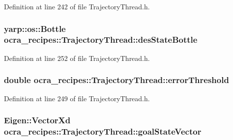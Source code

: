 Definition at line 242 of file Trajectory\+Thread.\+h.

\subsubsection[{\texorpdfstring{des\+State\+Bottle}{desStateBottle}}]{\setlength{\rightskip}{0pt plus 5cm}yarp\+::os\+::\+Bottle ocra\+\_\+recipes\+::\+Trajectory\+Thread\+::des\+State\+Bottle\hspace{0.3cm}{\ttfamily [protected]}}\hypertarget{classocra__recipes_1_1TrajectoryThread_aae66d09e0f64c124428cebcdb53bdf33}{}\label{classocra__recipes_1_1TrajectoryThread_aae66d09e0f64c124428cebcdb53bdf33}


Definition at line 252 of file Trajectory\+Thread.\+h.

\subsubsection[{\texorpdfstring{error\+Threshold}{errorThreshold}}]{\setlength{\rightskip}{0pt plus 5cm}double ocra\+\_\+recipes\+::\+Trajectory\+Thread\+::error\+Threshold\hspace{0.3cm}{\ttfamily [protected]}}\hypertarget{classocra__recipes_1_1TrajectoryThread_a69ca8ea525dd7529fbeae6d8bb9529b3}{}\label{classocra__recipes_1_1TrajectoryThread_a69ca8ea525dd7529fbeae6d8bb9529b3}


Definition at line 249 of file Trajectory\+Thread.\+h.

\subsubsection[{\texorpdfstring{goal\+State\+Vector}{goalStateVector}}]{\setlength{\rightskip}{0pt plus 5cm}Eigen\+::\+Vector\+Xd ocra\+\_\+recipes\+::\+Trajectory\+Thread\+::goal\+State\+Vector\hspace{0.3cm}{\ttfamily [protected]}}\hypertarget{classocra__recipes_1_1TrajectoryThread_abb9ba9fef74e7336a325ad1183f4e090}{}\label{classocra__recipes_1_1TrajectoryThread_abb9ba9fef74e7336a325ad1183f4e090}


